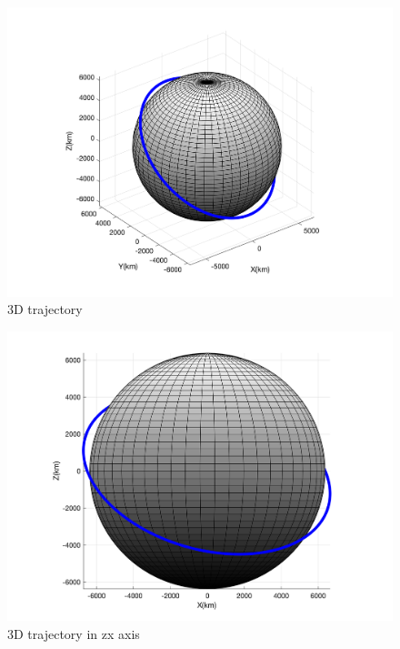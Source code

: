     \begin{figure}[H]
        \caption{3D trajectory}
        \centering
        \includegraphics[width=16cm]{../Figure/Short_project/3Dof_view}
    \end{figure}

    \begin{figure}[H]
        \caption{3D trajectory in zx axis}
        \centering
        \includegraphics[width=16cm]{../Figure/Short_project/xz_view}
    \end{figure}


